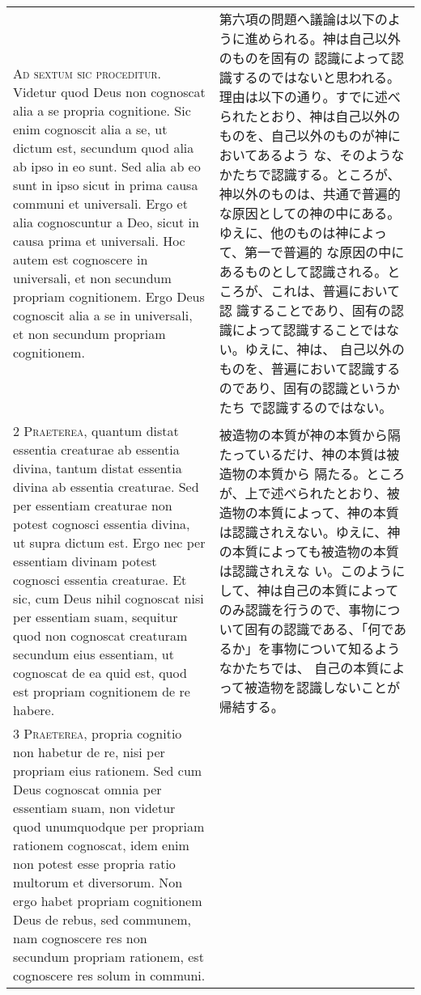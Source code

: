 \documentclass[10pt]{jsarticle} %
\begin{document}
\begin{longtable}{p{21em}p{21em}}
{\huge A}{\scshape d sextum sic proceditur}. Videtur quod Deus non
cognoscat alia a se propria cognitione. Sic enim cognoscit alia a se,
ut dictum est, secundum quod alia ab ipso in eo sunt. Sed alia ab eo
sunt in ipso sicut in prima causa communi et universali. Ergo et alia
cognoscuntur a Deo, sicut in causa prima et universali. Hoc autem est
cognoscere in universali, et non secundum propriam cognitionem. Ergo
Deus cognoscit alia a se in universali, et non secundum propriam
cognitionem.

&

第六項の問題へ議論は以下のように進められる。神は自己以外のものを固有の
認識によって認識するのではないと思われる。理由は以下の通り。すでに述べ
られたとおり、神は自己以外のものを、自己以外のものが神においてあるよう
な、そのようなかたちで認識する。ところが、神以外のものは、共通で普遍的
な原因としての神の中にある。ゆえに、他のものは神によって、第一で普遍的
な原因の中にあるものとして認識される。ところが、これは、普遍において認
識することであり、固有の認識によって認識することではない。ゆえに、神は、
自己以外のものを、普遍において認識するのであり、固有の認識というかたち
で認識するのではない。

\\


{\scshape 2 Praeterea}, quantum distat essentia creaturae ab essentia
divina, tantum distat essentia divina ab essentia creaturae. Sed per
essentiam creaturae non potest cognosci essentia divina, ut supra
dictum est. Ergo nec per essentiam divinam potest cognosci essentia
creaturae. Et sic, cum Deus nihil cognoscat nisi per essentiam suam,
sequitur quod non cognoscat creaturam secundum eius essentiam, ut
cognoscat de ea quid est, quod est propriam cognitionem de re habere.


&

被造物の本質が神の本質から隔たっているだけ、神の本質は被造物の本質から
隔たる。ところが、上で述べられたとおり、被造物の本質によって、神の本質
は認識されえない。ゆえに、神の本質によっても被造物の本質は認識されえな
い。このようにして、神は自己の本質によってのみ認識を行うので、事物につ
いて固有の認識である、「何であるか」を事物について知るようなかたちでは、
自己の本質によって被造物を認識しないことが帰結する。

\\


{\scshape 3 Praeterea}, propria cognitio non habetur de re, nisi per
propriam eius rationem. Sed cum Deus cognoscat omnia per essentiam
suam, non videtur quod unumquodque per propriam rationem cognoscat,
idem enim non potest esse propria ratio multorum et diversorum. Non
ergo habet propriam cognitionem Deus de rebus, sed communem, nam
cognoscere res non secundum propriam rationem, est cognoscere res
solum in communi.


\end{longtable}
\end{document}
